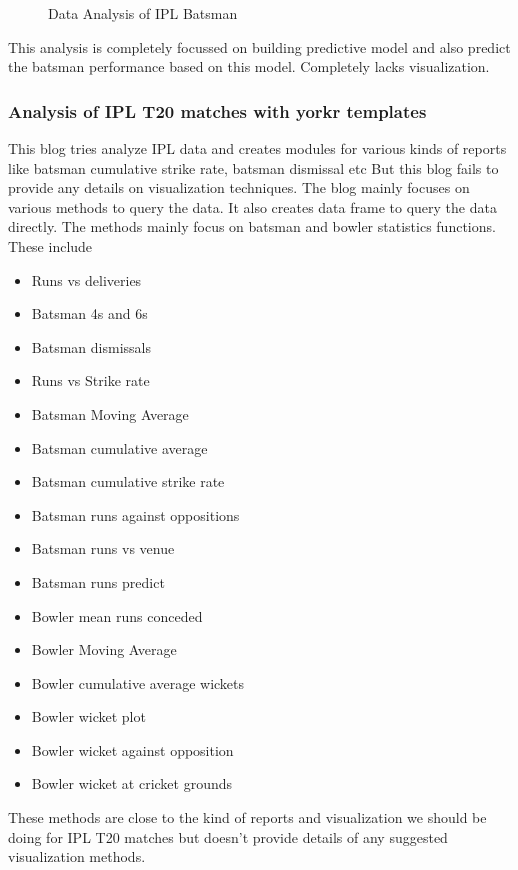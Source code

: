 \documentclass[sigconf]{acmart}
\begin{document}
\begin{figure}[htbp]
\centering
{}
\caption{Data Analysis of IPL Batsman}
\label{fig:battingRNK}
\end{figure}

This analysis is completely focussed on building predictive model and also predict the batsman
performance based on this model. Completely lacks visualization.

\subsubsection{Analysis of IPL T20 matches with yorkr templates}
This blog \cite{www-rbloggers-ipl} tries analyze IPL data and creates modules for 
various kinds of reports like batsman cumulative strike rate, batsman dismissal etc
But this blog fails to provide any details on visualization techniques. The blog mainly
focuses on various methods to query the data. It also creates data frame to query the data directly.
The methods mainly focus on batsman and bowler statistics functions. 
These include
\begin{itemize}
\item Runs vs deliveries
\item Batsman 4s and 6s
\item Batsman dismissals
\item Runs vs Strike rate
\item Batsman Moving Average
\item Batsman cumulative average
\item Batsman cumulative strike rate
\item Batsman runs against oppositions
\item Batsman runs vs venue
\item Batsman runs predict
\item Bowler mean runs conceded
\item Bowler Moving Average
\item Bowler cumulative average wickets
\item Bowler wicket plot
\item Bowler wicket against opposition
\item Bowler wicket at cricket grounds
\end{itemize}

These methods are close to the kind of reports and visualization
we  should be doing for IPL T20 matches but doesn't provide details
of any suggested visualization methods.
\end{document}
